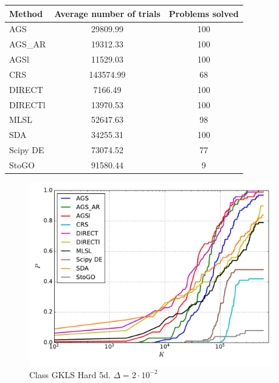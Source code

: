 \documentclass[a4paper]{article}
\begin{document}
\begin{tabular}{lcc}
\hline
 Method   &  Average number of trials  &  Problems solved  \\
\hline
 AGS      &          29809.99          &        100        \\
 AGS\_AR   &          19312.33          &        100        \\
 AGSl     &          11529.03          &        100        \\
 CRS      &         143574.99          &        68         \\
 DIRECT   &          7166.49           &        100        \\
 DIRECTl  &          13970.53          &        100        \\
 MLSL     &          52647.63          &        98         \\
 SDA      &          34255.31          &        100        \\
 Scipy DE &          73074.52          &        77         \\
 StoGO    &          91580.44          &         9         \\
\hline
\end{tabular}
\begin{figure}[H]
  \center
  \includegraphics[width=0.95\textwidth]{../experiments/gklsh5d/cmc.pdf}
  \caption{Class GKLS Hard 5d. $\Delta=2\cdot10^{-2}$}
\end{figure}
\end{document}
